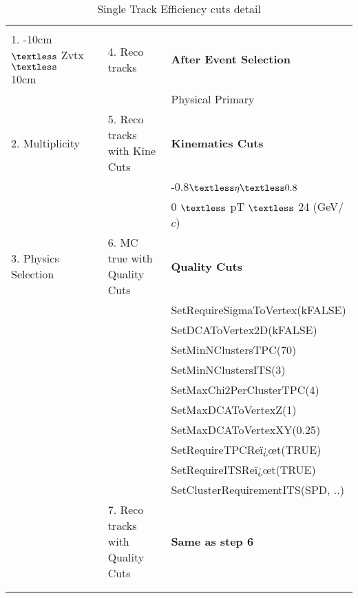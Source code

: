 \begin{table}[h]
\begin{tabular}{ p{4cm} c | p{5cm} |  p{5.5cm} }
\hline && &\\		            	                        	
1. -10cm $\textless$ Zvtx $\textless$ 10cm  &&               4. Reco tracks        &                             {\textbf {After Event Selection}}\\
															    &&& Physical Primary \\
															
															
2. Multiplicity                     &&               5. Reco tracks with Kine Cuts         &               {\textbf  {Kinematics Cuts }}\\
															    &&& -0.8$\textless \eta \textless  0.8$\\
															    &&& 0 $\textless$ pT $\textless $ 24 (GeV/$c$)\\



3. Physics Selection    &&               6. MC true with Quality Cuts         &      			      {\textbf  {Quality Cuts }} \\
																	&&&SetRequireSigmaToVertex(kFALSE) \\
																	&&&SetDCAToVertex2D(kFALSE) \\
																	&&&SetMinNClustersTPC(70)\\
																	&&&SetMinNClustersITS(3)\\
																	&&&SetMaxChi2PerClusterTPC(4)\\
																	&&&SetMaxDCAToVertexZ(1) \\
																	&&&SetMaxDCAToVertexXY(0.25) \\
																	&&&SetRequireTPCReï¿œt(TRUE) \\
																	&&&SetRequireITSReï¿œt(TRUE) \\
																	&&&SetClusterRequirementITS(SPD, ..) \\


 				      &&               7. Reco tracks with Quality Cuts         &             {\textbf  {Same as step 6}} \\

&& &\\		            	            		

 \hline \hline
 \\
\end{tabular}
\caption{\large {Single Track Efficiency cuts detail}} %
\label{table:effCuts}	
\end{table}


